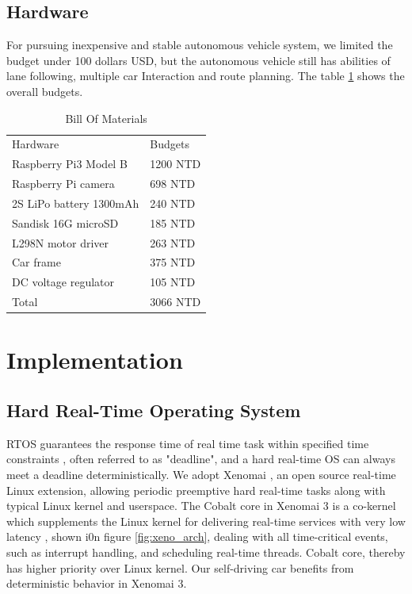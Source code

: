 \documentclass[conference]{IEEEtran}
\begin{document}
\subsection{Hardware}

For pursuing inexpensive and stable autonomous vehicle system, we limited the budget under 100 dollars USD, but the autonomous vehicle still has abilities of lane following, multiple car Interaction and route planning. The table \ref{hardware_list} shows the overall budgets.

\begin{table}
	\centering
	\caption{Bill Of Materials}
	\label{hardware_list}
	\begin{tabular}{ll}
		Hardware                & Budgets  \\
		Raspberry Pi3 Model B   & 1200 NTD \\
		Raspberry Pi camera     & 698 NTD  \\
		2S LiPo battery 1300mAh & 240 NTD  \\
		Sandisk 16G microSD     & 185 NTD  \\
		L298N motor driver      & 263 NTD  \\
		Car frame               & 375 NTD  \\
		DC voltage regulator    & 105 NTD  \\
		Total                   & 3066 NTD
	\end{tabular}
\end{table}

\section{Implementation}

\subsection{Hard Real-Time Operating System}

RTOS guarantees the response time of real time task within specified time constraints \cite{RTOS}, often referred to as "deadline", and a hard real-time OS can always meet a deadline deterministically. We adopt Xenomai \cite{Xenomai}, an open source real-time Linux extension, allowing periodic preemptive hard real-time tasks along with typical Linux kernel and userspace. The Cobalt core in Xenomai 3 is a co-kernel which supplements the Linux kernel for delivering real-time services with very low latency \cite{rtlws2015}, shown i0n figure \ref{fig:xeno_arch}, dealing with all time-critical events, such as interrupt handling, and scheduling real-time threads. Cobalt core, thereby has higher priority over Linux kernel. Our self-driving car benefits from deterministic behavior in Xenomai 3.
\end{document}
